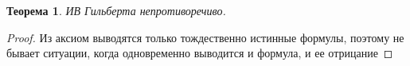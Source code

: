 \documentclass[a4paper]{article}
\newtheorem{theorem}{Теорема}[section]
\theoremstyle{definition}
\theoremstyle{remark}
\begin{document}
    \begin{theorem}
        ИВ Гильберта непротиворечиво.
    \end{theorem}
    \begin{proof}
        Из аксиом выводятся только тождественно истинные формулы, поэтому не бывает ситуации, когда одновременно выводится и формула, и ее отрицание
    \end{proof}
        
\end{document}
